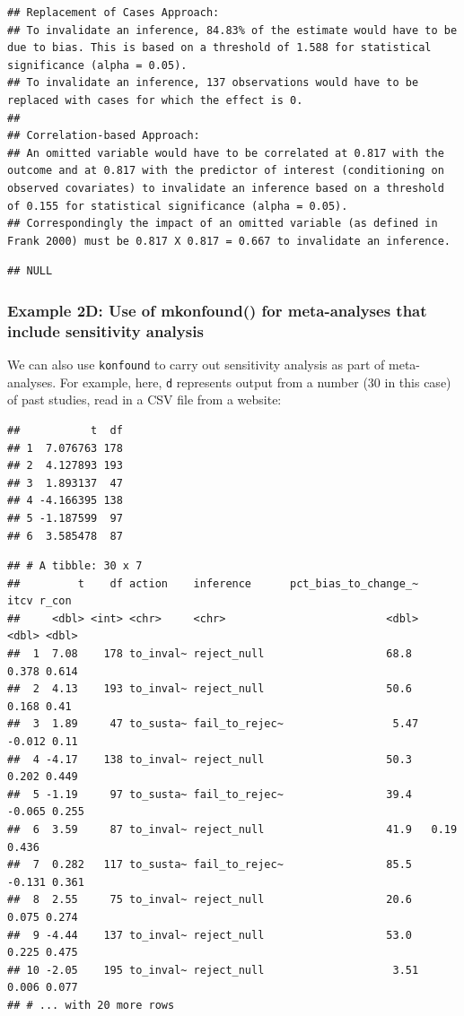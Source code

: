 \documentclass[man]{apa6}
\theoremstyle{definition}
\theoremstyle{definition}
\theoremstyle{definition}
\theoremstyle{remark}
\begin{document}
\begin{verbatim}
## Replacement of Cases Approach:
## To invalidate an inference, 84.83% of the estimate would have to be due to bias. This is based on a threshold of 1.588 for statistical significance (alpha = 0.05).
## To invalidate an inference, 137 observations would have to be replaced with cases for which the effect is 0.
## 
## Correlation-based Approach:
## An omitted variable would have to be correlated at 0.817 with the outcome and at 0.817 with the predictor of interest (conditioning on observed covariates) to invalidate an inference based on a threshold of 0.155 for statistical significance (alpha = 0.05).
## Correspondingly the impact of an omitted variable (as defined in Frank 2000) must be 0.817 X 0.817 = 0.667 to invalidate an inference.
\end{verbatim}

\begin{verbatim}
## NULL
\end{verbatim}

\subsubsection{Example 2D: Use of mkonfound() for meta-analyses that
include sensitivity
analysis}\label{example-2d-use-of-mkonfound-for-meta-analyses-that-include-sensitivity-analysis}

We can also use \texttt{konfound} to carry out sensitivity analysis as
part of meta-analyses. For example, here, \texttt{d} represents output
from a number (30 in this case) of past studies, read in a CSV file from
a website:

\begin{verbatim}
##           t  df
## 1  7.076763 178
## 2  4.127893 193
## 3  1.893137  47
## 4 -4.166395 138
## 5 -1.187599  97
## 6  3.585478  87
\end{verbatim}

\begin{verbatim}
## # A tibble: 30 x 7
##         t    df action    inference      pct_bias_to_change_~   itcv r_con
##     <dbl> <int> <chr>     <chr>                         <dbl>  <dbl> <dbl>
##  1  7.08    178 to_inval~ reject_null                   68.8   0.378 0.614
##  2  4.13    193 to_inval~ reject_null                   50.6   0.168 0.41 
##  3  1.89     47 to_susta~ fail_to_rejec~                 5.47 -0.012 0.11 
##  4 -4.17    138 to_inval~ reject_null                   50.3   0.202 0.449
##  5 -1.19     97 to_susta~ fail_to_rejec~                39.4  -0.065 0.255
##  6  3.59     87 to_inval~ reject_null                   41.9   0.19  0.436
##  7  0.282   117 to_susta~ fail_to_rejec~                85.5  -0.131 0.361
##  8  2.55     75 to_inval~ reject_null                   20.6   0.075 0.274
##  9 -4.44    137 to_inval~ reject_null                   53.0   0.225 0.475
## 10 -2.05    195 to_inval~ reject_null                    3.51  0.006 0.077
## # ... with 20 more rows
\end{verbatim}
\end{document}
